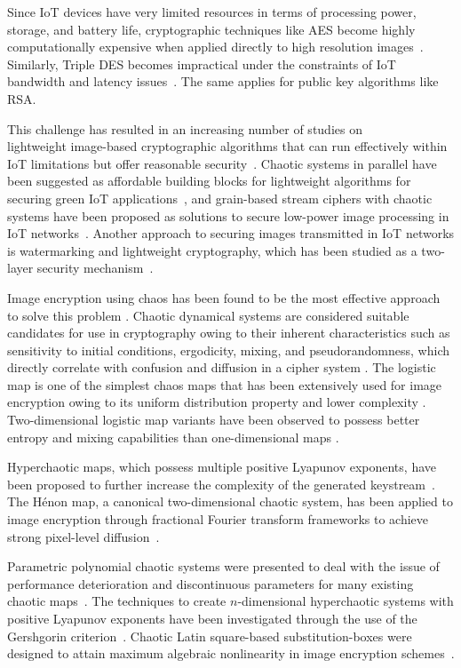 Since IoT devices have very limited resources in terms of processing
power, storage, and battery life, cryptographic techniques like AES become highly computationally expensive when applied directly to high
resolution images~\cite{heron2009aes}. Similarly, Triple DES becomes impractical under the constraints of IoT bandwidth and latency issues~\cite{barker2004tdea}. The same applies for public key algorithms like RSA.

This challenge has resulted in an increasing number of studies on \\lightweight image-based cryptographic algorithms that can run effectively within IoT limitations but offer reasonable security~\cite{roy2020ieca}.
Chaotic systems in parallel have been suggested as affordable building blocks for lightweight algorithms for securing green IoT applications~\cite{gu2022iepsbp}, and grain-based stream ciphers with chaotic systems have been proposed as solutions to secure low-power image processing in IoT networks~\cite{kumari2023grain}.
Another approach to securing images transmitted in IoT networks is watermarking and lightweight cryptography, which has been studied as a two-layer security mechanism~\cite{gupta2023twolevel}.

Image encryption using chaos has been found to be the most effective approach 
to solve this problem \cite{fridrich1998symmetric}.
Chaotic dynamical systems are considered suitable candidates for use in cryptography 
owing to their inherent characteristics such as sensitivity to initial conditions, 
ergodicity, mixing, and pseudorandomness, which directly correlate with confusion 
and diffusion in a cipher system \cite{lan2018integrated}.
The logistic map is one of the simplest chaos maps that has been extensively used for 
image encryption owing to its uniform distribution property and lower complexity 
\cite{noshadian2018optimizing}.
Two-dimensional logistic map variants have been observed to possess better entropy 
and mixing capabilities than one-dimensional maps \cite{hua2019cosine}.

Hyperchaotic maps, which possess multiple positive Lyapunov
exponents, have been proposed to further increase the complexity
of the generated keystream~\cite{alexan2023hyperchaotic}.
The H\'enon map, a canonical two-dimensional chaotic system, has
been applied to image encryption through fractional Fourier
transform frameworks to achieve strong pixel-level
diffusion~\cite{mursi2014image}.

Parametric polynomial chaotic systems were presented to deal with
the issue of performance deterioration and discontinuous parameters
for many existing chaotic maps~\cite{hua2022parametric}. The techniques to create
$n$-dimensional hyperchaotic systems with positive Lyapunov
exponents have been investigated through the use of the Gershgorin
criterion~\cite{zhang2023ndimensional}. Chaotic Latin square-based substitution-boxes
were designed to attain maximum algebraic nonlinearity in image
encryption schemes~\cite{hua2021sbox}.

